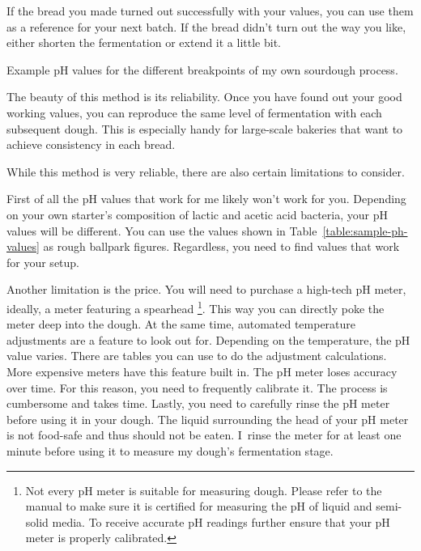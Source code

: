 If the bread you made turned out successfully with your values,
you can use them as a reference for your next batch. If the
bread didn't turn out the way you like, either shorten
the fermentation or extend it a little bit.

\begin{table}[!htb]
    \centering
        \caption[Dough's pH during bread preparation]{Example pH values for
            the different breakpoints of my own sourdough process.}%
        \label{table:sample-ph-values}
\end{table}

The beauty of this method is its reliability. Once you have found
out your good working values, you can reproduce
the same level of fermentation with each subsequent dough.
This is especially handy for large-scale bakeries that want
to achieve consistency in each bread.

While this method is very reliable, there are also certain
limitations to consider.

First of all the pH values that work for me likely won't work for
you. Depending on your own starter's composition of lactic
and acetic acid bacteria, your pH values will be different.
You can use the values shown in Table~\ref{table:sample-ph-values}
as rough ballpark figures. Regardless, you need to find values
that work for your setup.

Another limitation is the price. You will need to purchase
a high-tech pH meter, ideally, a meter featuring a spearhead
\footnote{Not every pH meter is suitable for measuring dough.
Please refer to the manual to make sure it is certified for
measuring the pH of liquid and semi-solid media. To receive
accurate pH readings further ensure that your pH meter
is properly calibrated.}.
This way you can directly poke the meter deep into the dough.
At the same time, automated temperature adjustments are a
feature to look out for. Depending on the temperature,
the pH value varies. There are tables you can use to
do the adjustment calculations. More expensive meters
have this feature built in. The pH meter loses accuracy
over time. For this reason, you need to frequently
calibrate it. The process is cumbersome and takes time.
Lastly, you need to carefully rinse the pH meter before
using it in your dough. The liquid surrounding the
head of your pH meter is not food-safe and thus should
not be eaten. I~rinse the meter for at least one minute
before using it to measure my dough's fermentation stage.

